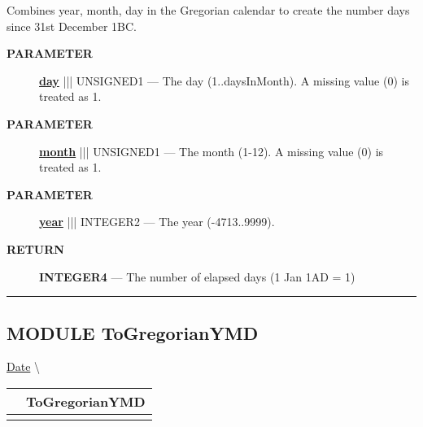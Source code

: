 \par





Combines year, month, day in the Gregorian calendar to create the number days since 31st December 1BC.






\par
\begin{description}
\item [\colorbox{tagtype}{\color{white} \textbf{\textsf{PARAMETER}}}] \textbf{\underline{day}} ||| UNSIGNED1 --- The day (1..daysInMonth). A missing value (0) is treated as 1.
\item [\colorbox{tagtype}{\color{white} \textbf{\textsf{PARAMETER}}}] \textbf{\underline{month}} ||| UNSIGNED1 --- The month (1-12). A missing value (0) is treated as 1.
\item [\colorbox{tagtype}{\color{white} \textbf{\textsf{PARAMETER}}}] \textbf{\underline{year}} ||| INTEGER2 --- The year (-4713..9999).
\end{description}







\par
\begin{description}
\item [\colorbox{tagtype}{\color{white} \textbf{\textsf{RETURN}}}] \textbf{INTEGER4} --- The number of elapsed days (1 Jan 1AD = 1)
\end{description}




\rule{\linewidth}{0.5pt}
\subsection*{\textsf{\colorbox{headtoc}{\color{white} MODULE}
ToGregorianYMD}}

\hypertarget{ecldoc:date.togregorianymd}{}
\hspace{0pt} \hyperlink{ecldoc:Date}{Date} \textbackslash 

{\renewcommand{\arraystretch}{1.5}
\begin{tabularx}{\textwidth}{|>{\raggedright\arraybackslash}l|X|}
\hline
\hspace{0pt}\mytexttt{\color{red} } & \textbf{ToGregorianYMD} \\
\hline
\multicolumn{2}{|>{\raggedright\arraybackslash}X|}{\hspace{0pt}\mytexttt{\color{param} (Days\_t days)}} \\
\hline
\end{tabularx}
}

